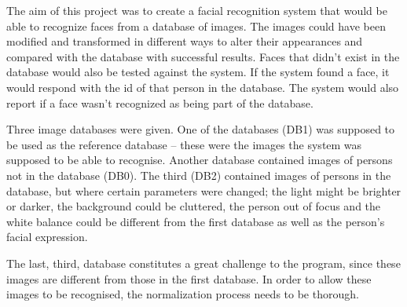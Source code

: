 The aim of this project was to create a facial recognition system that would be able to recognize faces from a database of images. The images could have been modified and transformed in different ways to alter their appearances and compared with the database with successful results. Faces that didn’t exist in the database would also be tested against the system. If the system found a face, it would respond with the id of that person in the database. The system would also report if a face wasn’t recognized as being part of the database.

Three image databases were given. One of the databases (DB1) was supposed to be used as the reference database – these were the images the system was supposed to be able to recognise. Another database contained images of persons not in the database (DB0). The third (DB2) contained images of persons in the database, but where certain parameters were changed; the light might be brighter or darker, the background could be cluttered, the person out of focus and the white balance could be different from the first database as well as the person’s facial expression.

The last, third, database constitutes a great challenge to the program, since these images are different from those in the first database. In order to allow these images to be recognised, the normalization process needs to be thorough.
